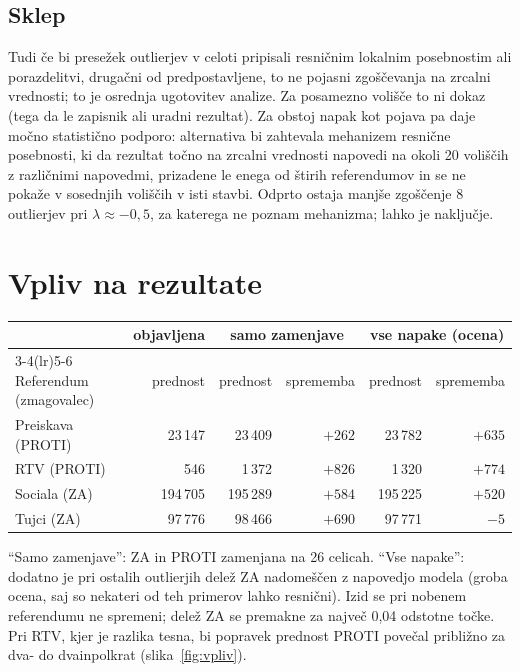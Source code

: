 \documentclass[11pt,a4paper]{article}
\begin{document}
\subsection{Sklep}

Tudi če bi presežek outlierjev v celoti pripisali resničnim lokalnim posebnostim ali porazdelitvi, drugačni od predpostavljene, to ne pojasni zgoščevanja na zrcalni vrednosti; to je osrednja ugotovitev analize. Za posamezno volišče to ni dokaz (tega da le zapisnik ali uradni rezultat). Za obstoj napak kot pojava pa daje močno statistično podporo: alternativa bi zahtevala mehanizem resnične posebnosti, ki da rezultat točno na zrcalni vrednosti napovedi na okoli 20 voliščih z različnimi napovedmi, prizadene le enega od štirih referendumov in se ne pokaže v sosednjih voliščih v isti stavbi. Odprto ostaja manjše zgoščenje 8 outlierjev pri $\lambda\approx-0{,}5$, za katerega ne poznam mehanizma; lahko je naključje.

\section{Vpliv na rezultate}

\begin{center}
\small\begin{tabular}{lrrrrr}
\toprule
 & objavljena & \multicolumn{2}{c}{samo zamenjave} & \multicolumn{2}{c}{vse napake (ocena)} \\
\cmidrule(lr){3-4}\cmidrule(lr){5-6}
Referendum (zmagovalec) & prednost & prednost & sprememba & prednost & sprememba \\
\midrule
Preiskava (PROTI) & 23\,147 & 23\,409 & $+262$ & 23\,782 & $+635$ \\
RTV (PROTI) & 546 & 1\,372 & $+826$ & 1\,320 & $+774$ \\
Sociala (ZA) & 194\,705 & 195\,289 & $+584$ & 195\,225 & $+520$ \\
Tujci (ZA) & 97\,776 & 98\,466 & $+690$ & 97\,771 & $-5$ \\
\bottomrule
\end{tabular}
\end{center}

``Samo zamenjave'': ZA in PROTI zamenjana na 26 celicah. ``Vse napake'': dodatno je pri ostalih outlierjih delež ZA nadomeščen z napovedjo modela (groba ocena, saj so nekateri od teh primerov lahko resnični). Izid se pri nobenem referendumu ne spremeni; delež ZA se premakne za največ 0,04 odstotne točke. Pri RTV, kjer je razlika tesna, bi popravek prednost PROTI povečal približno za dva- do dvainpolkrat (slika~\ref{fig:vpliv}).
\end{document}
